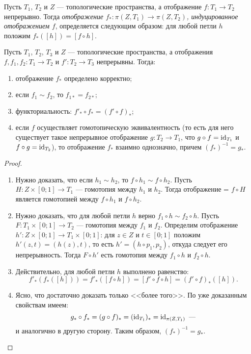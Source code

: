 \documentclass[main]{subfiles}
\begin{document}
\begin{definition}
	Пусть $ T_1 $, $ T_2 $ и $ Z $ --- топологические пространства, а отображение $ f \colon T_1 \to T_2 $ непрерывно.
	Тогда \emph{отображение $ f_* \colon \pi(Z, T_1) \to \pi(Z, T_2) $, индуцированное отображением $ f $},
	определяется следующим образом: для любой петли $ h $ положим $ f_*([h]) = [f \circ h] $.
\end{definition}

\begin{statement}
	Пусть $ T_1 $, $ T_2 $, $ T_3 $ и $ Z $ --- топологические пространства, а отображения
	$ f, f_1, f_2 \colon T_1 \to T_2 $ и $ f' \colon T_2 \to T_3 $ непрерывны. Тогда:
	\begin{enumerate}
		\item отображение $ f_* $ определено корректно;
		\item если $ f_1 \sim f_2 $, то $ f_{1 *} = f_{2 *} $;
		\item функториальность: $ f'_* \circ f_* = ( f' \circ f )_* $;
		\item если $ f $ осуществляет гомотопическую эквивалентность (то есть для него существует такое
			непрерывное отображение $ g \colon T_2 \to T_1 $, что $ g \circ f = \operatorname{id}_{T_1} $ и
			$ f \circ g = \operatorname{id}_{T_2} $), то отображение $ f_* $ взаимно однозначно, причем $ (f_*)^{-1} = g_* $.
	\end{enumerate}
\end{statement}

\begin{proof} \leavevmode
	\begin{enumerate}
		\item Нужно доказать, что если $ h_1 \sim h_2 $, то $ f \circ h_1 \sim f \circ h_2 $. Пусть
			$ H \colon Z \times [0; 1] \to T_1 $ --- гомотопия между $ h_1 $ и $ h_2 $. Тогда отображение =
			$ f \circ H $ является гомотопией между $ f \circ h_1 $ и $ f \circ h_2 $.
		\item Нужно доказать, что для любой петли $ h $ верно $ f_1 \circ h \sim f_2 \circ h $. Пусть
			$ F \colon T_1 \times [0; 1] \to T_2 $ --- гомотопия между $ f_1 $ и $ f_2 $. Определим отображение
			$ h' \colon Z \times [0; 1] \to T_1 \times [0; 1] $: для $ z \in Z $ и $ t \in [0; 1] $ положим
			$ h'(z, t) = (h(z), t) $, то есть $ h' = (h \circ p_1, p_2) $, откуда следует его непрерывность.
			Тогда $ F \circ h' $ есть гомотопия между $ f_1 \circ h $ и $ f_2 \circ h $.
		\item Действительно, для любой петли $ h $ выполнено равенство:
			\[ f'_*(f_*([h])) = f'_*([f \circ h]) = [f' \circ f \circ h] = (f' \circ f)_*([h]). \]
		\item Ясно, что достаточно доказать только <<более того>>. По уже доказанным свойствам имеем:
			\[ g_* \circ f_* = (g \circ f)_* = (\operatorname{id}_{T_1})_* = \operatorname{id}_{\pi(Z, T_1)} \text{ ---} \]
			и аналогично в другую сторону. Таким образом, $ (f_*)^{-1} = g_* $.
	\end{enumerate}
\end{proof}
\end{document}

